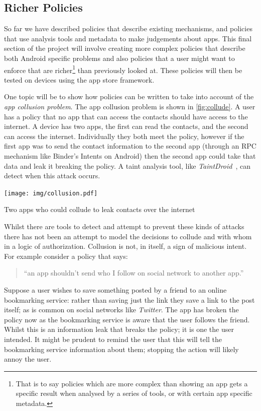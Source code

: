 \documentclass[a4paper,sfsidenotes]{%
  article%
}
\begin{document}
\subsection{Richer Policies}

So far we have described policies that describe existing mechanisms, and
policies that use analysis tools and metadata to make judgements about apps.
This final section of the project will involve creating more complex policies
that describe both Android specific problems and also policies that a user might
want to enforce that are richer\footnote{That is to say policies which are more
  complex than showing an app gets a specific result when analysed by a series
  of tools, or with certain app specific metadata.} than previously looked at.
These policies will then be tested on devices using the app store framework.

One topic will be to show how policies can be written to take into account of
the \emph{app collusion problem}.  The app collusion problem is shown in
\autoref{fig:collude}.  A user has a policy that no app that can access the
contacts should have access to the internet.  A device has two apps, the first
can read the contacts, and the second can access the internet.  Individually
they both meet the policy, however if the first app was to send the contact
information to the second app (through an \ac{RPC} mechanism like Binder's
Intents on Android) then the second app could take that data and leak it
breaking the policy.  A taint analysis tool, like
\emph{TaintDroid}~\cite{Enck:2010uw}, can detect when this attack occurs.

\begin{marginfigure}
  \texttt{[image: img/collusion.pdf]}
  \caption{Two apps who could collude to leak contacts over the internet}
  \label{fig:collude}
\end{marginfigure}

Whilst there are tools to detect and attempt to prevent these kinds of attacks
there has not been an attempt to model the decisions to collude and with whom in
a logic of authorization.  Collusion is not, in itself, a sign of malicious
intent.  For example consider a policy that says:
\begin{quote}
  ``an app shouldn't send who I follow on social network to another app.''
\end{quote}
Suppose a user wishes to save something posted by a friend to an online
bookmarking service: rather than saving just the link they save a link to the
post itself; as is common on social networks like \emph{Twitter}.  The app has
broken the policy now as the bookmarking service is aware that the user follows
the friend.  Whilst this is an information leak that breaks the policy; it is
one the user intended.  It might be prudent to remind the user that this will
tell the bookmarking service information about them; stopping the action
will likely annoy the user.
\end{document}
